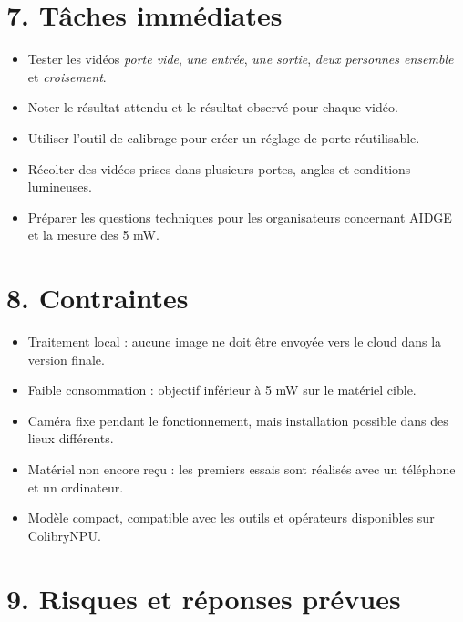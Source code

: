 \documentclass[11pt,a4paper]{article}
\begin{document}
\section*{7. Tâches immédiates}

\begin{itemize}
    \item Tester les vidéos \textit{porte vide}, \textit{une entrée}, \textit{une sortie}, \textit{deux personnes ensemble} et \textit{croisement}.
    \item Noter le résultat attendu et le résultat observé pour chaque vidéo.
    \item Utiliser l'outil de calibrage pour créer un réglage de porte réutilisable.
    \item Récolter des vidéos prises dans plusieurs portes, angles et conditions lumineuses.
    \item Préparer les questions techniques pour les organisateurs concernant AIDGE et la mesure des 5 mW.
\end{itemize}

\section*{8. Contraintes}

\begin{itemize}
    \item Traitement local : aucune image ne doit être envoyée vers le cloud dans la version finale.
    \item Faible consommation : objectif inférieur à 5 mW sur le matériel cible.
    \item Caméra fixe pendant le fonctionnement, mais installation possible dans des lieux différents.
    \item Matériel non encore reçu : les premiers essais sont réalisés avec un téléphone et un ordinateur.
    \item Modèle compact, compatible avec les outils et opérateurs disponibles sur ColibryNPU.
\end{itemize}

\section*{9. Risques et réponses prévues}
\end{document}
